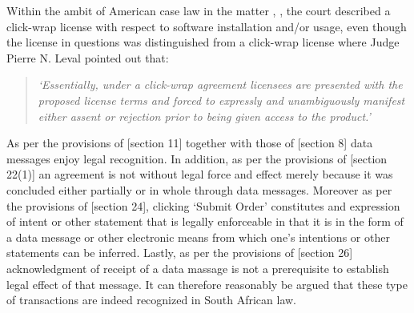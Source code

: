 \documentclass[11pt]{article}
\begin{document}
Within the ambit of American case law in the matter
, \cite{leval04_register_v_verio}, the court
described a click-wrap license with respect to software installation and/or
usage, even though the license in questions was distinguished from a click-wrap
license where Judge Pierre N. Leval pointed out that:
\begin{quote}
\textit{`Essentially, under a click-wrap agreement licensees are presented with the proposed license terms and forced to expressly and unambiguously manifest either assent or rejection prior to being given access to the product.'}
\end{quote}
As per the provisions of [section 11]\cite{rsa02_elect_comm_trans_act} together
with those of [section 8]\cite{rsa12_elect_comm_trans_amend_bill} data messages
enjoy legal recognition. In addition, as per the provisions of [section
22(1)]\cite{rsa02_elect_comm_trans_act} an agreement is not without legal force
and effect merely because it was concluded either partially or in whole through
data messages. Moreover as per the provisions of [section
24]\cite{rsa02_elect_comm_trans_act}, clicking `Submit Order' constitutes and
expression of intent or other statement that is legally enforceable in that it
is in the form of a data message or other electronic means from which one's
intentions or other statements can be inferred. Lastly, as per the provisions of
[section 26]\cite{rsa02_elect_comm_trans_act} acknowledgment of receipt of a data
massage is not a prerequisite to establish legal effect of that message. It can
therefore reasonably be argued that these type of transactions are indeed
recognized in South African law.\\
\end{document}
